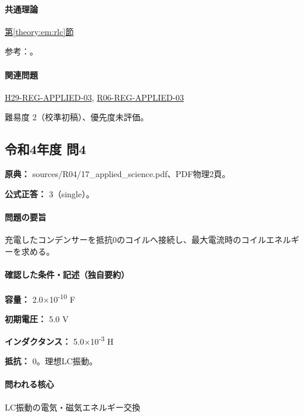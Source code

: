 \paragraph{共通理論} \hyperref[theory:em:rlc]{第\ref*{theory:em:rlc}節}

\par 参考：\cite{mit_em12}。

\paragraph{関連問題} \hyperref[q:h29-reg-applied-03]{H29-REG-APPLIED-03}, \hyperref[q:r06-reg-applied-03]{R06-REG-APPLIED-03}

\par 難易度 2（校準初稿）、優先度未評価。

\subsection{令和4年度 問4}
\label{q:r04-reg-applied-04}

\noindent\textbf{原典：} sources/R04/17\_applied\_science.pdf、PDF物理2頁。

\textbf{公式正答：} 3（single）。

\paragraph{問題の要旨} 充電したコンデンサーを抵抗0のコイルへ接続し、最大電流時のコイルエネルギーを求める。

\paragraph{確認した条件・記述（独自要約）}\mbox{}\par

\noindent\textbf{容量：} 2.0×10\textsuperscript{-10} F\par

\noindent\textbf{初期電圧：} 5.0 V\par

\noindent\textbf{インダクタンス：} 5.0×10\textsuperscript{-3} H\par

\noindent\textbf{抵抗：} 0。理想LC振動。\par

\paragraph{問われる核心} LC振動の電気・磁気エネルギー交換

